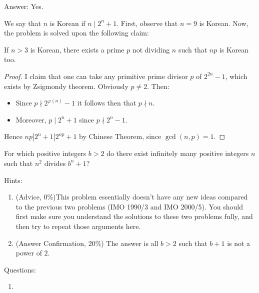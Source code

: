 \documentclass[11pt,twoside]{scrartcl}
\begin{document}
\begin{soln}
    Answer: Yes.

We say that $n$ is Korean if $n \mid 2^n + 1$. First, observe that $n = 9$ is Korean. Now, the
problem is solved upon the following claim:
\begin{claim*}
If $n > 3$ is Korean, there exists a prime $p$ not dividing $n$ such that $np$ is Korean too.
\end{claim*}
\begin{proof}
    I claim that one can take any primitive prime divisor $p$ of $2^{2n} - 1$, which exists by
    Zsigmondy theorem. Obviously $p \ne 2$. Then:
    \begin{itemize}
        \item Since $p \nmid 2^{\varphi(n)} - 1$ it follows then that $p \nmid n$.
        \item Moreover, $p \mid 2^n + 1$ since $p\nmid 2^n - 1$.
    \end{itemize}

    Hence $np | 2^n + 1 | 2^{np} + 1$ by Chinese Theorem, since $\gcd(n, p) = 1$.
        
\end{proof}
\end{soln}
\begin{problem}
    For which positive integers $b > 2$ do there exist infinitely many positive integers $n$ such that $n^2$ divides $b^n + 1$?
\end{problem}

Hints:
\begin{enumerate}
    \item (Advice, $0\%$)This problem essentially doesn't have any new ideas compared to the previous two problems (IMO 1990/3 and IMO 2000/5). You should first make sure you understand the solutions to these two problems fully, and then try to repeat those arguments here.
    \item (Answer Confirmation, $20\%$) The answer is all $b > 2$ such that $b+1$ is not a power of $2$.
\end{enumerate}

Questions:
\begin{enumerate}
    \item \TBD
\end{enumerate}
\end{document}
